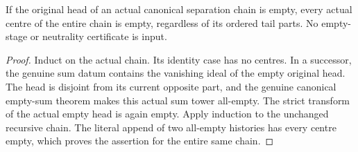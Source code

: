 \begin{lemma}
\label{hir:original-empty-head-separation-chain-all-empty}
\leanok
If the original head of an actual canonical separation chain is empty,
every actual centre of the entire chain is empty, regardless of its
ordered tail parts. No empty-stage or neutrality certificate is input.
\end{lemma}
\begin{proof}
Induct on the actual chain. Its identity case has no centres. In a
successor, the genuine sum datum contains the vanishing ideal of the
empty original head. The head is disjoint from its current opposite
part, and the genuine canonical empty-sum theorem makes this actual
sum tower all-empty. The strict transform of the actual empty head
is again empty. Apply induction to the unchanged recursive chain.
The literal append of two all-empty histories has every centre empty,
which proves the assertion for the entire same chain.
\end{proof}

